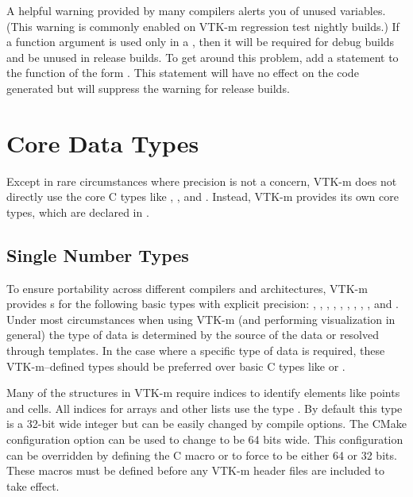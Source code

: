 \begin{commonerrors}
  A helpful warning provided by many compilers alerts you of unused
  variables. (This warning is commonly enabled on VTK-m regression test
  nightly builds.) If a function argument is used only in a
  , then it will be required for debug builds and
  be unused in release builds. To get around this problem, add a statement
  to the function of the form . This
  statement will have no effect on the code generated but will suppress the
  warning for release builds.
\end{commonerrors}




\section{Core Data Types}
\label{sec:CoreDataTypes}

Except in rare circumstances where precision is not a concern, VTK-m does
not directly use the core C types like , ,
and . Instead, VTK-m provides its own core types, which
are declared in .

\subsection{Single Number Types}

To ensure portability across different compilers and architectures, VTK-m
provides s for the following basic types with explicit
precision: , , , ,
, , , , , and
. Under most circumstances when using VTK-m (and performing
visualization in general) the type of data is determined by the source of the
data or resolved through templates. In the case where a specific type of
data is required, these VTK-m--defined types should be preferred over basic
C types like  or .

Many of the structures in VTK-m require indices to identify elements like
points and cells. All indices for arrays and other lists use the type
. By default this type is a 32-bit wide integer but can be easily
changed by compile options. The CMake configuration option
 can be used to change  to be 64
bits wide. This configuration can be overridden by defining the C macro
 or  to
force  to be either 64 or 32 bits. These macros must be defined
before any VTK-m header files are included to take effect.

